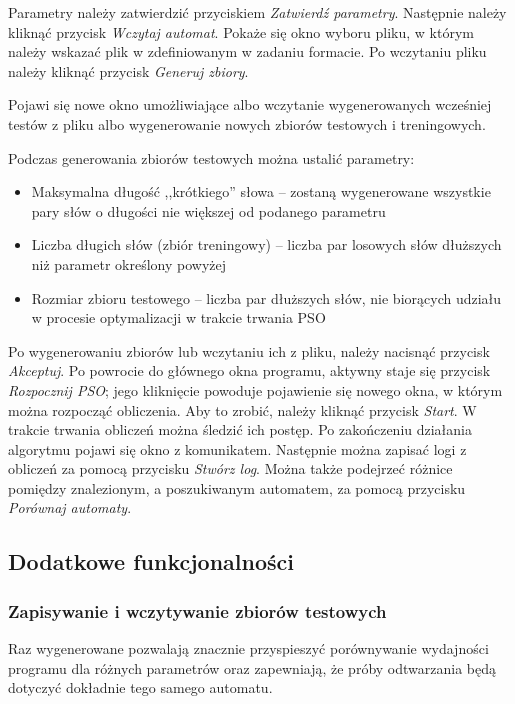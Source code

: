\documentclass{../llncs_template_final/llncs}
\begin{document}
Parametry należy zatwierdzić przyciskiem \emph{Zatwierdź parametry}. Następnie należy kliknąć przycisk \emph{Wczytaj automat}. Pokaże się okno wyboru pliku, w którym należy wskazać plik w zdefiniowanym w zadaniu formacie. Po wczytaniu pliku należy kliknąć przycisk \emph{Generuj zbiory}.

Pojawi się nowe okno umożliwiające albo wczytanie wygenerowanych wcześniej testów z pliku albo wygenerowanie nowych zbiorów testowych i treningowych.

 Podczas generowania zbiorów testowych można ustalić parametry:

\begin{itemize}
\item Maksymalna długość ,,krótkiego'' słowa -- zostaną wygenerowane wszystkie pary słów o długości nie większej od podanego parametru
\item Liczba długich słów (zbiór treningowy) -- liczba par losowych słów dłuższych niż parametr określony powyżej
\item Rozmiar zbioru testowego -- liczba par dłuższych słów, nie biorących udziału w procesie optymalizacji w trakcie trwania PSO
\end{itemize}

Po wygenerowaniu zbiorów lub wczytaniu ich z pliku, należy nacisnąć przycisk \emph{Akceptuj}. Po powrocie do głównego okna programu, aktywny staje się przycisk \emph{Rozpocznij PSO}; jego kliknięcie powoduje pojawienie się nowego okna, w którym można rozpocząć obliczenia. Aby to zrobić, należy kliknąć przycisk \emph{Start}. W trakcie trwania obliczeń można śledzić ich postęp. Po zakończeniu działania algorytmu pojawi się okno z komunikatem. Następnie można zapisać logi z obliczeń za pomocą przycisku \emph{Stwórz log}. Można także podejrzeć różnice pomiędzy znalezionym, a poszukiwanym automatem, za pomocą przycisku \emph{Porównaj automaty}. 

\subsection{Dodatkowe funkcjonalności}

\subsubsection{Zapisywanie i wczytywanie zbiorów testowych}
Raz wygenerowane pozwalają znacznie przyspieszyć porównywanie wydajności programu dla różnych parametrów oraz zapewniają, że próby odtwarzania będą dotyczyć dokładnie tego samego automatu.
\end{document}
